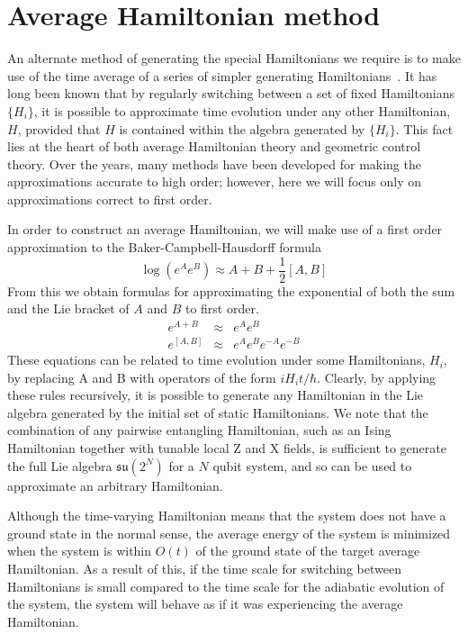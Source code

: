 \documentclass[11pt,oneside,final]{huthesis}%
\begin{document}
\section{Average Hamiltonian method}
\label{sec:avg}
An alternate method of generating the special Hamiltonians we require
is to make use of the time average of a series of simpler generating
Hamiltonians~\cite{Waugh68}. It has long been known that by 
regularly switching between a set of fixed Hamiltonians $\{H_i\}$,
it is possible to approximate time evolution under any other 
Hamiltonian, $H$, provided that $H$ is contained within the algebra 
generated by $\{H_i\}$. This fact lies at the heart of both average 
Hamiltonian theory and geometric control theory. Over the years, many 
methods have been developed for making the approximations accurate 
to high order; however, here we will focus only on approximations 
correct to first order.

In order to construct an average Hamiltonian, we will make use of a first order approximation to the Baker-Campbell-Hausdorff formula
\begin{equation}
\log(e^A e^B) \approx A + B + \frac{1}{2}[A,B]
\end{equation}
From this we obtain formulas for approximating the exponential of both the sum and the Lie bracket of $A$ and $B$ to first order.
\begin{eqnarray}
e^{A+B} &\approx& e^{A} e^{B}\\
e^{[A,B]} &\approx& e^{A} e^{B} e^{-A} e^{-B}
\end{eqnarray}
These equations can be related to time evolution under some
Hamiltonians, $H_i$, by replacing A and B with operators of the form
$i H_i t/\hbar$. Clearly, by applying these rules recursively,
it is possible to generate any Hamiltonian in the Lie algebra
generated by the initial set of static Hamiltonians. We note that the
combination of any pairwise entangling Hamiltonian, such as an Ising
Hamiltonian together with tunable local Z and X fields, is sufficient
to generate the full Lie algebra $\mathfrak{su}(2^N)$ for a $N$ qubit system, and
so can be used to approximate an arbitrary Hamiltonian.

Although the time-varying Hamiltonian means that the system does not have a ground state in the normal sense, the average energy of the system is minimized when the system is within $O(t)$ of the ground state of the target average Hamiltonian. As a result of this, if the time scale for switching between Hamiltonians is small compared to the time scale for the adiabatic evolution of the system, the system will behave as if it was experiencing the average Hamiltonian.
\end{document}
